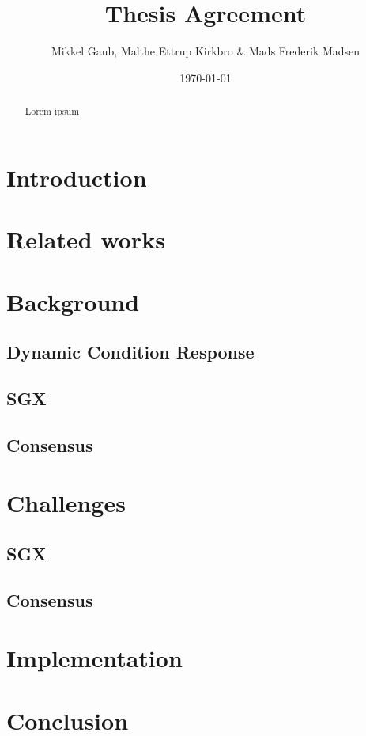 \documentclass{article}
\author{Mikkel Gaub, Malthe Ettrup Kirkbro \& Mads Frederik Madsen}
\title{Thesis Agreement}
\date{\today}
\begin{document}
\maketitle
\thispagestyle{empty}

\vspace{\fill}

\begin{abstract}
Lorem ipsum
\end{abstract}

\pagebreak

\tableofcontents

\pagebreak

	\section{Introduction}

	\section{Related works}

	\section{Background}

		\subsection{Dynamic Condition Response}

		\subsection{SGX}

		\subsection{Consensus}

	\section{Challenges}

		\subsection{SGX}

		\subsection{Consensus}	

	\section{Implementation}

	\section{Conclusion}

	\begin{thebibliography}{9}


	\end{thebibliography}
\end{document}
